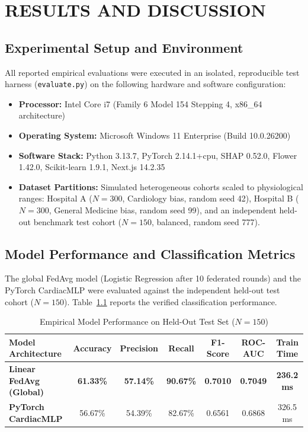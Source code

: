 \documentclass[12pt,a4paper,oneside]{report}
\begin{document}


\chapter{RESULTS AND DISCUSSION}

\section{Experimental Setup and Environment}
All reported empirical evaluations were executed in an isolated, reproducible test harness (\texttt{evaluate.py}) on the following hardware and software configuration:
\begin{itemize}
    \item \textbf{Processor:} Intel Core i7 (Family 6 Model 154 Stepping 4, x86\_64 architecture)
    \item \textbf{Operating System:} Microsoft Windows 11 Enterprise (Build 10.0.26200)
    \item \textbf{Software Stack:} Python 3.13.7, PyTorch 2.14.1+cpu, SHAP 0.52.0, Flower 1.42.0, Scikit-learn 1.9.1, Next.js 14.2.35
    \item \textbf{Dataset Partitions:} Simulated heterogeneous cohorts scaled to physiological ranges: Hospital A ($N=300$, Cardiology bias, random seed 42), Hospital B ($N=300$, General Medicine bias, random seed 99), and an independent held-out benchmark test cohort ($N=150$, balanced, random seed 777).
\end{itemize}

\section{Model Performance and Classification Metrics}
The global FedAvg model (Logistic Regression after 10 federated rounds) and the PyTorch CardiacMLP were evaluated against the independent held-out test cohort ($N=150$). Table~\ref{tab:classification_metrics} reports the verified classification performance.

\begin{table}[H]
\centering
\caption{Empirical Model Performance on Held-Out Test Set ($N=150$)}
\label{tab:classification_metrics}
\begin{tabularx}{\textwidth}{l c c c c c c}
\toprule
\textbf{Model Architecture} & \textbf{Accuracy} & \textbf{Precision} & \textbf{Recall} & \textbf{F1-Score} & \textbf{ROC-AUC} & \textbf{Train Time} \\
\midrule
\textbf{Linear FedAvg (Global)} & \textbf{61.33\%} & \textbf{57.14\%} & \textbf{90.67\%} & \textbf{0.7010} & \textbf{0.7049} & \textbf{236.2 ms} \\
\textbf{PyTorch CardiacMLP} & 56.67\% & 54.39\% & 82.67\% & 0.6561 & 0.6868 & 326.5 ms \\
\bottomrule
\end{tabularx}
\end{table}
\end{document}
